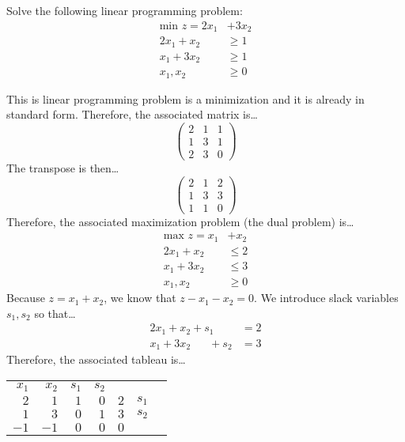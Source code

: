 \documentclass[11pt,letterpaper]{article}
\begin{document}
\newpage



 Solve the following linear programming problem:
	\[
	\begin{aligned}
	\text{min } z= 2x_1 &+ 3x_2 \\
	2x_1 + x_2&\geq 1 \\
	x_1 + 3x_2&\geq 1 \\
	x_1, x_2&\geq 0 
	\end{aligned}
	\] \pspace

\sol This is linear programming problem is a minimization and it is already in standard form. Therefore, the associated matrix is\dots
	\[
	\begin{pmatrix}
	2 & 1 & 1 \\
	1 & 3 & 1 \\
	2 & 3 & 0 
	\end{pmatrix}
	\]
The transpose is then\dots
	\[
	\begin{pmatrix}
	2 & 1 & 2 \\
	1 & 3 & 3 \\
	1 & 1 & 0 
	\end{pmatrix}
	\]
Therefore, the associated maximization problem (the dual problem) is\dots
	\[
	\begin{aligned}
	\text{max }  z= x_1 &+ x_2 \\
	2x_1 + x_2&\leq 2 \\
	x_1 + 3x_2&\leq 3 \\
	x_1, x_2&\geq 0
	\end{aligned}
	\] 
Because $z= x_1 + x_2$, we know that $z - x_1 - x_2= 0$. We introduce slack variables $s_1, s_2$ so that\dots
	\[
	\begin{aligned}	
	2x_1 + x_2 + s_1 \phantom{+ s_2}&= 2 \\
	x_1 + 3x_2 \phantom{+ s_1} + s_2&= 3
	\end{aligned}
	\] 
Therefore, the associated tableau is\dots

	\begin{table}[!ht]
	\centering
	\begin{tabular}{rrrrrrr}
	{\small $x_1$} & {\small $x_2$} & {\small $s_1$} & {\small $s_2$} \\
	$2$ & $1$ & $1$ & \multicolumn{1}{r|}{$0$} & $2$ & {\small $s_1$} \\
	$1$ & $3$ & $0$ & \multicolumn{1}{r|}{$1$} & $3$ & {\small $s_2$} \\ \cline{1-5}
	$-1$ & $-1$ & $0$ & \multicolumn{1}{r|}{$0$} & $0$ 
	\end{tabular}
	\end{table}
\end{document}
